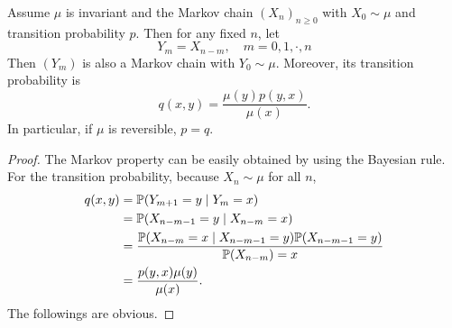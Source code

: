 \begin{thm}
    Assume $\mu$ is invariant and the Markov chain $(X_n)_{n \geq 0}$ with $X_0 \sim \mu$ and transition probability $p$. Then for any fixed $n$, let
    \begin{equation*}
        Y_m = X_{n-m},\quad m = 0,1,\cdot, n
    \end{equation*}
    Then $(Y_m)$ is also a Markov chain with $Y_0 \sim \mu$. Moreover, its transition probability is
    \begin{equation*}
        q(x,y) = \frac{\mu(y)p(y,x)}{\mu(x)}.
    \end{equation*}
    In particular, if $\mu$ is reversible, $p = q$.
\end{thm}
\begin{proof}
    The Markov property can be easily obtained by using the Bayesian rule. For the transition probability, because $X_n \sim \mu$ for all $n$,
    \begin{equation*}
        \begin{aligned}
            q(x,y) &= \mathbb{P}(Y_{m+1} = y \mid Y_m = x) \\
            &= \mathbb{P}(X_{n-m-1} = y \mid X_{n-m} = x) \\
            &= \frac{\mathbb{P}(X_{n-m} = x \mid X_{n-m-1} = y)\mathbb{P}(X_{n-m-1} = y)}{\mathbb{P}(X_{n-m}) = x} \\
            &= \frac{p(y,x)\mu(y)}{\mu(x)}.
        \end{aligned}
    \end{equation*}
    The followings are obvious.
\end{proof}

